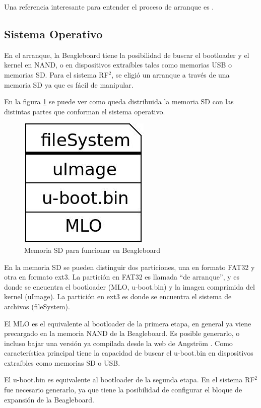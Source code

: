 Una referencia interesante para entender el proceso de arranque es \cite{linuxBoot}.


\subsection{Sistema Operativo}
En el arranque, la Beagleboard tiene la posibilidad de buscar el bootloader y el kernel en NAND, o en dispositivos extraíbles tales como memorias USB o memorias SD. Para el sistema RF$^{2}$, se eligió un arranque a través de una memoria SD ya que es fácil de manipular.

En la figura \ref{Fig:SD} se puede ver como queda distribuida la memoria SD con las distintas partes
que conforman el sistema operativo. 

\begin{figure}[H]
\centering
  \begin{center}
  \includegraphics[scale=.4]{Imagenes/sd.jpg} 
  \end{center}
  \caption{Memoria SD para funcionar en Beagleboard}\label{Fig:SD} 
\end{figure}

En la memoria SD se pueden distinguir dos particiones, una en formato FAT32 y otra
en formato ext3. La partición en FAT32 es llamada “de arranque”, y es donde se encuentra 
el bootloader (MLO, u-boot.bin) y la imagen comprimida del kernel (uImage). 
La partición en ext3 es donde se encuentra el sistema de archivos (fileSystem).

El MLO es el equivalente al bootloader de la primera etapa, en general ya viene precargado en la memoria NAND de la Beagleboard. Es posible generarlo, o incluso bajar una versión ya compilada desde la web de Angström \cite{Angs}. Como característica principal tiene la capacidad de buscar el u-boot.bin en dispositivos extraíbles como memorias SD o USB.

El u-boot.bin es equivalente al bootloader de la segunda etapa. En el sistema RF$^{2}$ fue necesario generarlo, ya que tiene la posibilidad de configurar el bloque de expansión de la Beagleboard.

